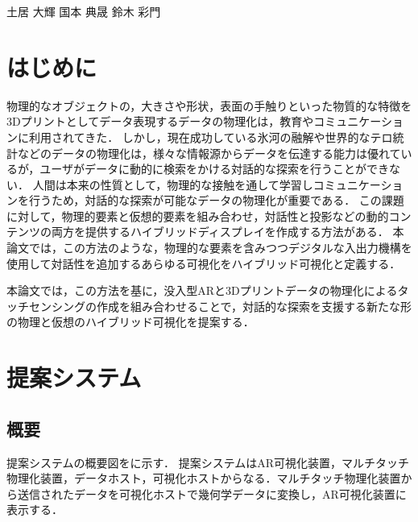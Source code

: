 \documentclass[a4paper,10pt,twocolumn,uplatex]{jsarticle}
\date{10}
\begin{document}
{土居 大輝}
{国本 典晟}
{鈴木 彩門}

\section{はじめに}
物理的なオブジェクトの，大きさや形状，表面の手触りといった物質的な特徴を3Dプリントとしてデータ表現するデータの物理化は，教育やコミュニケーションに利用されてきた．
しかし，現在成功している氷河の融解や世界的なテロ統計などのデータの物理化は，様々な情報源からデータを伝達する能力は優れているが，ユーザがデータに動的に検索をかける対話的な探索を行うことができない．
人間は本来の性質として，物理的な接触を通して学習しコミュニケーションを行うため，対話的な探索が可能なデータの物理化が重要である．
この課題に対して，物理的要素と仮想的要素を組み合わせ，対話性と投影などの動的コンテンツの両方を提供するハイブリッドディスプレイを作成する方法\cite{hybrid}がある．
本論文では，この方法のような，物理的な要素を含みつつデジタルな入出力機構を使用して対話性を追加するあらゆる可視化をハイブリッド可視化と定義する．\par
本論文では，この方法を基に，没入型ARと3Dプリントデータの物理化によるタッチセンシングの作成を組み合わせることで，対話的な探索を支援する新たな形の物理と仮想のハイブリッド可視化を提案する．

\section{提案システム}
\subsection{概要}
\label{概要}
提案システムの概要図をに示す．
提案システムはAR可視化装置，マルチタッチ物理化装置，データホスト，可視化ホストからなる．マルチタッチ物理化装置から送信されたデータを可視化ホストで幾何学データに変換し，AR可視化装置に表示する．
\end{document}
